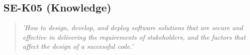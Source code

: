 \subsection{SE-K05 (Knowledge)}

  \begin{quote}
    \textit{'How to design, develop, and deploy software
    solutions that are secure and effective in delivering the
    requirements of stakeholders, and the factors that affect
    the design of a successful code.'}
  \end{quote}

\newpage
